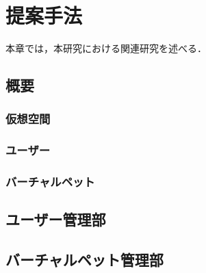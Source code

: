 ﻿\chapter{提案手法}
本章では，本研究における関連研究を述べる．

\section{概要}

\subsection{仮想空間}

\subsection{ユーザー}

\subsection{バーチャルペット}

\section{ユーザー管理部}

\section{バーチャルペット管理部}
